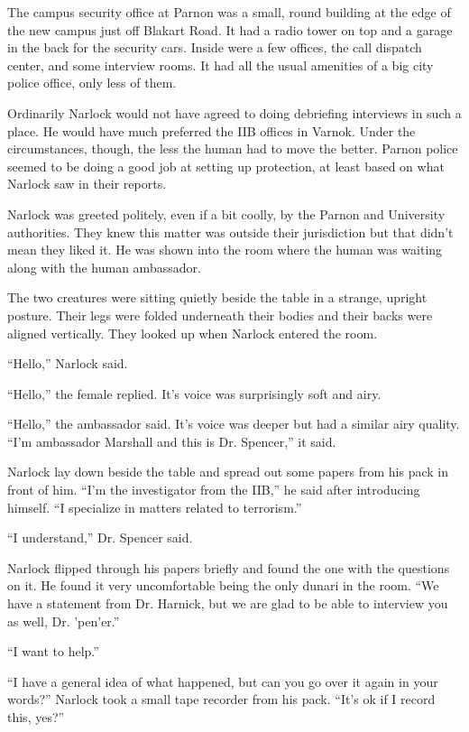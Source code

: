 
The campus security office at Parnon was a small, round building at the edge of the new campus
just off Blakart Road. It had a radio tower on top and a garage in the back for the security
cars. Inside were a few offices, the call dispatch center, and some interview rooms. It had all
the usual amenities of a big city police office, only less of them.

Ordinarily Narlock would not have agreed to doing debriefing interviews in such a place. He would
have much preferred the IIB offices in Varnok. Under the circumstances, though, the less the
human had to move the better. Parnon police seemed to be doing a good job at setting up
protection, at least based on what Narlock saw in their reports.

Narlock was greeted politely, even if a bit coolly, by the Parnon and University authorities. They
knew this matter was outside their jurisdiction but that didn't mean they liked it. He was shown
into the room where the human was waiting along with the human ambassador.

The two creatures were sitting quietly beside the table in a strange, upright posture. Their
legs were folded underneath their bodies and their backs were aligned vertically. They looked up
when Narlock entered the room.

``Hello,'' Narlock said.

``Hello,'' the female replied. It's voice was surprisingly soft and airy.

``Hello,'' the ambassador said. It's voice was deeper but had a similar airy quality. ``I'm
ambassador Marshall and this is Dr. Spencer,'' it said.

Narlock lay down beside the table and spread out some papers from his pack in front of him. ``I'm
the investigator from the IIB,'' he said after introducing himself. ``I specialize in matters
related to terrorism.''

``I understand,'' Dr. Spencer said.

Narlock flipped through his papers briefly and found the one with the questions on it. He found
it very uncomfortable being the only dunari in the room. ``We have a statement from Dr. Harnick,
but we are glad to be able to interview you as well, Dr. 'pen'er.''

``I want to help.''

``I have a general idea of what happened, but can you go over it again in your words?'' Narlock
took a small tape recorder from his pack. ``It's ok if I record this, yes?''

